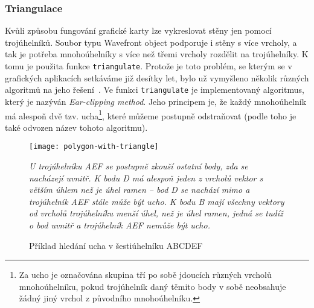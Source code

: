 \documentclass[a4paper, 11pt]{report}
\begin{document}
\subsubsection{Triangulace}
Kvůli způsobu fungování grafické karty lze vykreslovat stěny jen pomocí trojúhelníků. Soubor typu Wavefront object podporuje i stěny s více vrcholy, a tak je potřeba mnohoúhelníky s více než třemi vrcholy rozdělit na trojúhelníky. K tomu je použita funkce \texttt{triangulate}. Protože je toto problém, se kterým se v grafických aplikacích setkáváme již desítky let, bylo už vymyšleno několik různých algoritmů na jeho řešení~\cite{wiki:triangulation}. Ve funkci \texttt{triangulate} je implementovaný algoritmus, který je nazýván \emph{Ear-clipping method}. Jeho principem je, že každý mnohoúhelník má alespoň dvě tzv. ucha\footnote{Za ucho je označována skupina tří po sobě jdoucích různých vrcholů mnohoúhelníku, pokud trojúhelník daný těmito body v sobě neobsahuje žádný jiný vrchol z původního mnohoúhelníku.}, které můžeme postupně odstraňovat (podle toho je také odvozen název tohoto algoritmu).

\begin{figure}[h]
    \texttt{[image: polygon-with-triangle]}
    \caption[Příklad hledání ucha v šestiúhelníku]{
    Příklad hledání ucha v šestiúhelníku ABCDEF}
    \small\emph{
    U trojúhelníku AEF se postupně zkouší ostatní body, zda se nacházejí uvnitř. K bodu D má alespoň jeden z vrcholů vektor s větším úhlem než je úhel ramen -- bod D se nachází mimo a trojúhelník AEF stále může být ucho. K bodu B mají všechny vektory od vrcholů trojúhelníku menší úhel, než je úhel ramen, jedná se tudíž o bod uvnitř a trojúhelník AEF nemůže být ucho.}
\end{figure}
\end{document}
